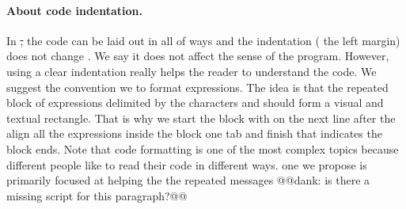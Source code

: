 \paragraph{About code indentation.}
In \st, the code can be laid out in all  of ways and the indentation ( the left margin) does not change . We say it does not affect the sense of the program. However, using a clear indentation really helps the reader to understand the code. \add{\paragraph
}
We suggest  the convention we  to format  expressions. The idea is that the repeated block of expressions delimited by the characters \ct{[} and \ct{]} should form a visual and textual rectangle. That is why we start the block with \ct{[} on the next line after the  align all the expressions inside the block  one tab\add{,} and finish  \ct{]} that indicates  the block ends. \add{\paragraph
}
Note that code formatting is one of the most complex topics because different people like to read their code in different ways.  one we propose is primarily focused at helping the  the repeated messages @@dank: is there a missing script for this paragraph?@@


